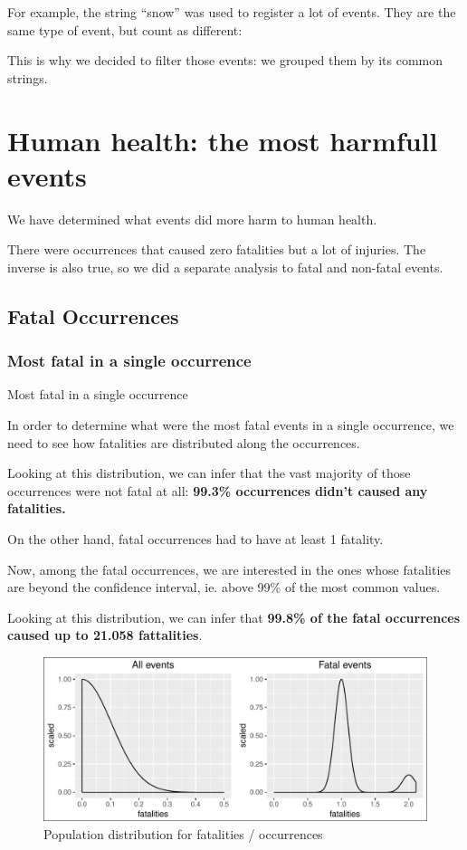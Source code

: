 \documentclass[]{article}
\begin{document}
For example, the string ``snow'' was used to register a lot of events.
They are the same type of event, but count as different:

This is why we decided to filter those events: we grouped them by its
common strings.

\section{Human health: the most harmfull
events}\label{human-health-the-most-harmfull-events}

We have determined what events did more harm to human health.

There were occurrences that caused zero fatalities but a lot of
injuries. The inverse is also true, so we did a separate analysis to
fatal and non-fatal events.

\subsection{Fatal Occurrences}\label{fatal-occurrences}

\subsubsection{Most fatal in a single
occurrence}\label{most-fatal-in-a-single-occurrence}

Most fatal in a single occurrence

In order to determine what were the most fatal events in a single
occurrence, we need to see how fatalities are distributed along the
occurrences.

Looking at this distribution, we can infer that the vast majority of
those occurrences were not fatal at all: \textbf{99.3\% occurrences
didn't caused any fatalities.}

On the other hand, fatal occurrences had to have at least 1 fatality.

Now, among the fatal occurrences, we are interested in the ones whose
fatalities are beyond the confidence interval, ie. above 99\% of the
most common values.

Looking at this distribution, we can infer that \textbf{99.8\% of the
fatal occurrences caused up to 21.058 fattalities}.

\begin{figure}[htbp]
\centering
\includegraphics{readme_files/figure-latex/fatal-distr-4-1.pdf}
\caption{Population distribution for fatalities / occurrences}
\end{figure}
\end{document}
